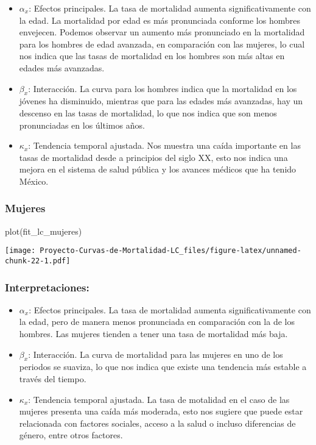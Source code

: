 \documentclass[
]{article}
\newenvironment{Shaded}{\begin{snugshade}}{\end{snugshade}}
\newcommand{\FunctionTok}[1]{\textcolor[rgb]{0.00,0.00,0.00}{#1}}
\newcommand{\NormalTok}[1]{#1}
\begin{document}
\begin{itemize}
\item
  \(\alpha_x\): Efectos principales. La tasa de mortalidad aumenta
  significativamente con la edad. La mortalidad por edad es más
  pronunciada conforme los hombres envejecen. Podemos observar un
  aumento más pronunciado en la mortalidad para los hombres de edad
  avanzada, en comparación con las mujeres, lo cual nos indica que las
  tasas de mortalidad en los hombres son más altas en edades más
  avanzadas.
\item
  \(\beta_x\): Interacción. La curva para los hombres indica que la
  mortalidad en los jóvenes ha disminuido, mientras que para las edades
  más avanzadas, hay un descenso en las tasas de mortalidad, lo que nos
  indica que son menos pronunciadas en los últimos años.
\item
  \(\kappa_x\): Tendencia temporal ajustada. Nos muestra una caída
  importante en las tasas de mortalidad desde a principios del siglo XX,
  esto nos indica una mejora en el sistema de salud pública y los
  avances médicos que ha tenido México.
\end{itemize}

\clearpage

\hypertarget{mujeres}{%
\subsubsection{Mujeres}\label{mujeres}}

\begin{Shaded}
\begin{Highlighting}[]
\FunctionTok{plot}\NormalTok{(fit\_lc\_mujeres)}
\end{Highlighting}
\end{Shaded}

\texttt{[image: Proyecto-Curvas-de-Mortalidad-LC\_files/figure-latex/unnamed-chunk-22-1.pdf]}

\hypertarget{interpretaciones-1}{%
\subsubsection{Interpretaciones:}\label{interpretaciones-1}}

\begin{itemize}
\item
  \(\alpha_x\): Efectos principales. La tasa de mortalidad aumenta
  significativamente con la edad, pero de manera menos pronunciada en
  comparación con la de los hombres. Las mujeres tienden a tener una
  tasa de mortalidad más baja.
\item
  \(\beta_x\): Interacción. La curva de mortalidad para las mujeres en
  uno de los periodos se suaviza, lo que nos indica que existe una
  tendencia más estable a través del tiempo.
\item
  \(\kappa_x\): Tendencia temporal ajustada. La tasa de motalidad en el
  caso de las mujeres presenta una caída más moderada, esto nos sugiere
  que puede estar relacionada con factores sociales, acceso a la salud o
  incluso diferencias de género, entre otros factores.
\end{itemize}
\end{document}
